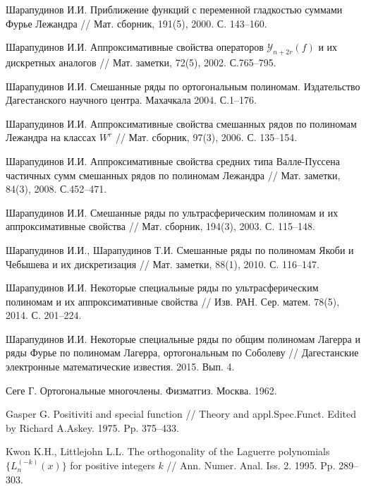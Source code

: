 \begin{thebibliography}{111}



{Шарапудинов И.И.} Приближение функций с переменной гладкостью суммами Фурье Лежандра // Мат. сборник,
191(5), 2000. С. 143--160.


{Шарапудинов И.И.} Аппроксимативные свойства операторов $\mathcal{ Y}_{n+2r}(f)$ и их дискретных аналогов // Мат. заметки, 72(5), 2002. С.765--795.


{Шарапудинов И.И.} Смешанные ряды по ортогональным полиномам. Издательство Дагестанского научного центра.
Махачкала 2004. С.1--176.


{Шарапудинов И.И.}
Аппроксимативные свойства смешанных рядов по полиномам Лежандра на классах $W^r$ //
Мат. сборник, 97(3), 2006. С. 135--154.


{Шарапудинов И.И.}
Аппроксимативные свойства средних типа Валле-Пуссена частичных сумм смешанных рядов по полиномам Лежандра // Мат. заметки, 84(3), 2008. С.452--471.


{Шарапудинов И.И.}
 Смешанные ряды по ультрасферическим полиномам и их аппроксимативные свойства
// Мат. сборник, 194(3), 2003. С. 115--148.


{Шарапудинов И.И., Шарапудинов Т.И.}
 Смешанные ряды по полиномам Якоби и Чебышева и их дискретизация
// Мат. заметки, 88(1), 2010. С. 116--147.


{Шарапудинов И.И.}
 Некоторые специальные ряды по ультрасферическим полиномам и их аппроксимативные свойства
// Изв. РАН. Сер. матем. 78(5), 2014. С. 201--224.


{Шарапудинов И.И.}
 Некоторые специальные ряды по общим полиномам Лагерра и ряды Фурье по полиномам Лагерра, ортогональным по Соболеву
// Дагестанские электронные математические известия. 2015. Вып. 4.


{Сеге Г.} Ортогональные многочлены. Физматгиз. Москва. 1962.


{Gasper G.}
 Positiviti and special function
// Theory and appl.Spec.Funct. Edited by Richard A.Askey. 1975. Pp. 375--433.


{Kwon K.H., Littlejohn L.L.}
 The orthogonality of the Laguerre polynomials $\{L_n^{(-k)}(x)\}$ for positive integers $k$
// Ann. Numer. Anal. Iss. 2. 1995. Pp. 289--303.



\end{thebibliography}
